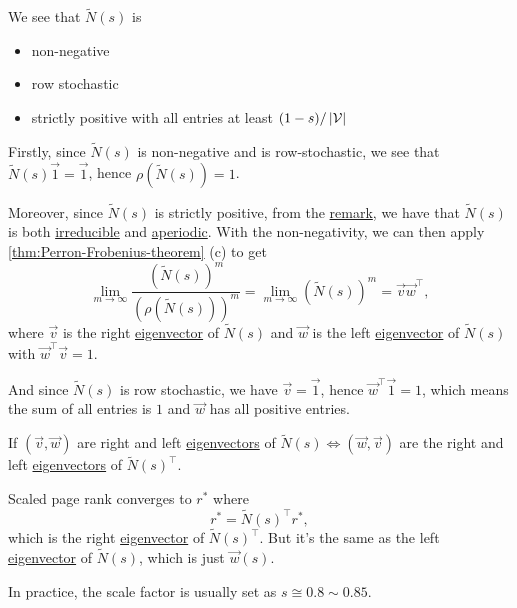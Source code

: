 \begin{note}
	We see that \(\widetilde{N}(s)\) is
	\begin{itemize}
		\item non-negative
		\item row stochastic
		\item strictly positive with all entries at least \((1-s) / \left\vert \mathcal{\MakeUppercase{v}} \right\vert \)
	\end{itemize}
\end{note}
Firstly, since \(\widetilde{N} (s)\) is non-negative and is row-stochastic, we see that \(\widetilde{N} (s)\vec{1} = \vec{1} \), hence
\(\rho(\widetilde{N}(s)) = 1\).

Moreover, since \(\widetilde{N} (s)\) is strictly positive, from the \hyperref[rmk:lec11-1]{remark}, we have that \(\widetilde{N} (s)\) is
both \hyperref[def:irreducible]{irreducible} and \hyperref[def:aperiodic]{aperiodic}. With the non-negativity, we can then apply
\autoref{thm:Perron-Frobenius-theorem} (c) to get
\[
	\lim\limits_{m \to \infty} \frac{(\widetilde{N} (s))^m}{(\rho (\widetilde{N} (s)))^m} = \lim\limits_{m \to \infty} (\widetilde{N} (s))^m = \vec{v} \vec{w} ^{\top},
\]
where \(\vec{v}\) is the right \hyperref[def:eigenvector]{eigenvector} of \(\widetilde{N}(s)\) and \(\vec{w}\) is the left \hyperref[def:eigenvector]{eigenvector} of \(\widetilde{N}(s)\) with
\(\vec{w}^{\top} \vec{v} = 1\).

And since \(\widetilde{N}(s)\) is row stochastic, we have \(\vec{v} = \vec{1}\), hence \(\vec{w}^{\top}\vec{1} = 1\),
which means the sum of all entries is \(1\) and \(\vec{w}\) has all positive entries.

If \((\vec{v}, \vec{w})\) are right and left \hyperref[def:eigenvector]{eigenvectors} of \(\widetilde{N}(s) \iff (\vec{w}, \vec{v})\) are the right and left \hyperref[def:eigenvector]{eigenvectors}
of \(\widetilde{N}(s)^{\top}\).

\begin{remark}
	Scaled page rank converges to \(r^{\ast} \) where
	\[
		r^{\ast} = \widetilde{N}(s)^{\top}r^{\ast},
	\]
	which is the right \hyperref[def:eigenvector]{eigenvector} of \(\widetilde{N}(s)^{\top}\). But it's the same as the left \hyperref[def:eigenvector]{eigenvector}
	of \(\widetilde{N}(s)\), which is just
	\(\vec{w}(s)\).
\end{remark}

\begin{note}
	In practice, the scale factor is usually set as \(s \cong 0.8 \sim 0.85\).
\end{note}